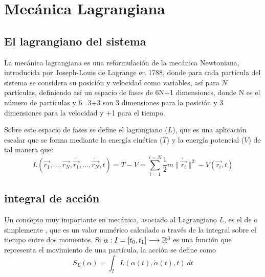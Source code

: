 \chapter{Mecánica Lagrangiana}\label{ch:mecanica-lagrangiana}

\section{El lagrangiano del sistema}\label{sec:el-lagrangiano-del-sistema}

La mecánica lagrangiana es una reformulación de la mecánica Newtoniana, introducida por Joseph-Louis de Lagrange en 1788, donde para cada partícula del sistema se considera su posición y velocidad como variables, así para $N$ partículas,  definiendo así un espacio de fases de 6N+1 dimensiones, donde N es el número de partículas y 6=3+3 son 3 dimensiones para la posición y 3 dimensiones para la velocidad y +1 para el tiempo.

Sobre este espacio de fases se define el lagrangiano ($L$), que es una aplicación escalar que se forma mediante la energía cinética ($T$) y la energía potencial ($V$) de tal manera que:
\begin{equation}
	\label{eq:lagrangiano_clasico}
	L(\vec{r_1},\dots,\vec{r_N},\dot{\vec{r_1}},\dots,\dot{\vec{r_N}},t)=T-V=\sum\limits_{i=1}^{i=N} \frac{1}{2}m\|\dot{\vec{r_i}}\|^2-V(\vec{r_i},t)
\end{equation}

\section{integral de acción}\label{sec:integral-de-accion}

Un concepto muy importante en mecánica, asociado al Lagrangiano $L$, es el de  o simplemente , que es un valor numérico calculado a través de la integral sobre el tiempo entre dos momentos.
Si $\alpha:I=[t_0, t_1]\longrightarrow \mathbb{R}^3$ es una función que representa el movimiento de una partícula, la acción se define como
\begin{equation}
	\label{eq:accion}
	S_L(\alpha) = \int_{I}L(\alpha(t), \dot{\alpha}(t), t)\ dt
\end{equation}

